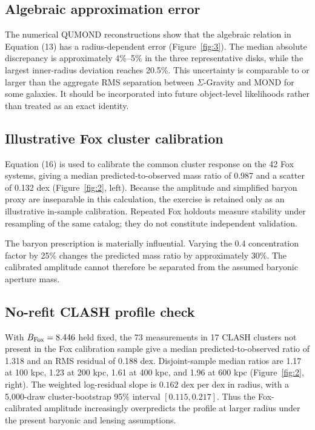 \documentclass[utf8]{FrontiersinHarvard}
\begin{document}
\subsection{Algebraic approximation error}\label{algebraic-approximation-error}

The numerical QUMOND reconstructions show that the algebraic relation in Equation (13) has a radius-dependent error (Figure~\ref{fig:3}). The median absolute discrepancy is approximately 4\%--5\% in the three representative disks, while the largest inner-radius deviation reaches 20.5\%. This uncertainty is comparable to or larger than the aggregate RMS separation between \(\Sigma\)-Gravity and MOND for some galaxies. It should be incorporated into future object-level likelihoods rather than treated as an exact identity.

\subsection{Illustrative Fox cluster calibration}\label{illustrative-fox-cluster-calibration}

Equation (16) is used to calibrate the common cluster response on the 42 Fox systems, giving a median predicted-to-observed mass ratio of 0.987 and a scatter of 0.132 dex (Figure~\ref{fig:2}, left). Because the amplitude and simplified baryon proxy are inseparable in this calculation, the exercise is retained only as an illustrative in-sample calibration. Repeated Fox holdouts measure stability under resampling of the same catalog; they do not constitute independent validation.

The baryon prescription is materially influential. Varying the 0.4 concentration factor by 25\% changes the predicted mass ratio by approximately 30\%. The calibrated amplitude cannot therefore be separated from the assumed baryonic aperture mass.

\subsection{No-refit CLASH profile check}\label{no-refit-clash-profile-check}

With \(B_{\rm Fox}=8.446\) held fixed, the 73 measurements in 17 CLASH clusters not present in the Fox calibration sample give a median predicted-to-observed ratio of 1.318 and an RMS residual of 0.188 dex. Disjoint-sample median ratios are 1.17 at 100 kpc, 1.23 at 200 kpc, 1.61 at 400 kpc, and 1.96 at 600 kpc (Figure~\ref{fig:2}, right). The weighted log-residual slope is \(0.162\) dex per dex in radius, with a 5,000-draw cluster-bootstrap 95\% interval \([0.115,0.217]\). Thus the Fox-calibrated amplitude increasingly overpredicts the profile at larger radius under the present baryonic and lensing assumptions.
\end{document}
